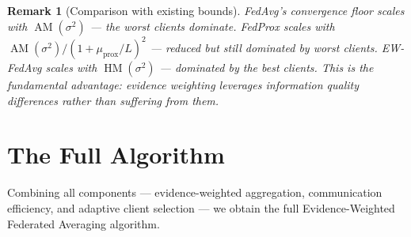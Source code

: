 \documentclass[11pt,a4paper]{article}
\newtheorem{remark}[theorem]{Remark}
\DeclareMathOperator{\AM}{AM}
\DeclareMathOperator{\HM}{HM}
\begin{document}
\begin{remark}[Comparison with existing bounds]
FedAvg's convergence floor scales with $\AM(\sigma^2)$ --- the worst clients
dominate. FedProx scales with $\AM(\sigma^2)/(1 + \mu_{\text{prox}}/L)^2$
--- reduced but still dominated by worst clients. EW-FedAvg scales with
$\HM(\sigma^2)$ --- dominated by the \emph{best} clients. This is the
fundamental advantage: evidence weighting leverages information quality
differences rather than suffering from them.
\end{remark}


\section{The Full Algorithm}
\label{sec:full-algorithm}

Combining all components --- evidence-weighted aggregation, communication
efficiency, and adaptive client selection --- we obtain the full
Evidence-Weighted Federated Averaging algorithm.
\end{document}
